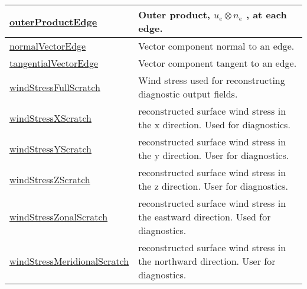 {\begin{center}
\begin{longtable}{| p{2.0in} | p{4.0in} |}
	\hline
	\hyperref[subsec:var_sec_scratch_outerProductEdge]{outerProductEdge} &  Outer product,  $u_e \otimes n_e$ , at each edge. \\
	\hline
	\hyperref[subsec:var_sec_scratch_normalVectorEdge]{normalVectorEdge} & Vector component normal to an edge. \\
	\hline
	\hyperref[subsec:var_sec_scratch_tangentialVectorEdge]{tangentialVectorEdge} & Vector component tangent to an edge. \\
	\hline
	\hyperref[subsec:var_sec_scratch_windStressFullScratch]{windStressFullScratch} & Wind stress used for reconstructing diagnostic output fields. \\
	\hline
	\hyperref[subsec:var_sec_scratch_windStressXScratch]{windStressXScratch} & reconstructed surface wind stress in the x direction. Used for diagnostics. \\
	\hline
	\hyperref[subsec:var_sec_scratch_windStressYScratch]{windStressYScratch} & reconstructed surface wind stress in the y direction. User for diagnostics. \\
	\hline
	\hyperref[subsec:var_sec_scratch_windStressZScratch]{windStressZScratch} & reconstructed surface wind stress in the z direction. User for diagnostics. \\
	\hline
	\hyperref[subsec:var_sec_scratch_windStressZonalScratch]{windStressZonalScratch} & reconstructed surface wind stress in the eastward direction. Used for diagnostics. \\
	\hline
	\hyperref[subsec:var_sec_scratch_windStressMeridionalScratch]{windStressMeridionalScratch} & reconstructed surface wind stress in the northward direction. User for diagnostics. \\
	\hline
\end{longtable}
\end{center}
}
